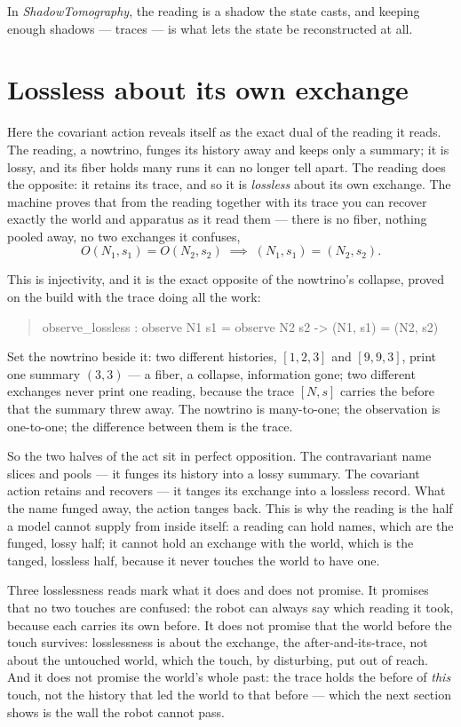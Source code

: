 In \emph{ShadowTomography}, the reading is a shadow the state casts, and keeping enough shadows --- traces --- is what lets
the state be reconstructed at all.

\section{Lossless about its own exchange}

Here the covariant action reveals itself as the exact dual of the reading it reads.
The reading, a nowtrino, funges its history away and keeps only a summary; it is lossy, and its fiber holds many runs it
can no longer tell apart.
The reading does the opposite: it retains its trace, and so it is \emph{lossless} about its own exchange.
The machine proves that from the reading together with its trace you can recover exactly the world and apparatus as it
read them --- there is no fiber, nothing pooled away, no two exchanges it confuses,
\[
  O(N_1,s_1) = O(N_2,s_2) \;\implies\; (N_1,s_1) = (N_2,s_2) .
\]

This is injectivity, and it is the exact opposite of the nowtrino's collapse, proved on the build with the trace doing
all the work:
\begin{quote}\ttfamily
observe\_lossless : observe N1 s1 = observe N2 s2 -> (N1, s1) = (N2, s2)
\end{quote}
Set the nowtrino beside it: two different histories, $[1,2,3]$ and $[9,9,3]$, print one summary $(3,3)$ --- a fiber, a
collapse, information gone; two different exchanges never print one reading, because the trace $[N,s]$ carries the before
that the summary threw away.
The nowtrino is many-to-one; the observation is one-to-one; the difference between them is the trace.

So the two halves of the act sit in perfect opposition.
The contravariant name slices and pools --- it funges its history into a lossy summary.
The covariant action retains and recovers --- it tanges its exchange into a lossless record.
What the name funged away, the action tanges back.
This is why the reading is the half a model cannot supply from inside itself: a reading can hold names, which are the
funged, lossy half; it cannot hold an exchange with the world, which is the tanged, lossless half, because it never
touches the world to have one.

Three losslessness reads mark what it does and does not promise.
It promises that no two touches are confused: the robot can always say which reading it took, because each carries its own
before.
It does not promise that the world before the touch survives: losslessness is about the exchange, the after-and-its-trace,
not about the untouched world, which the touch, by disturbing, put out of reach.
And it does not promise the world's whole past: the trace holds the before of \emph{this} touch, not the history that led
the world to that before --- which the next section shows is the wall the robot cannot pass.

